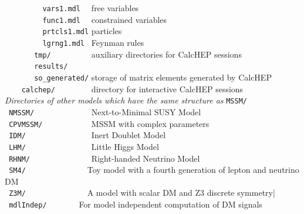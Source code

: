 \documentclass[12pt,a4paper]{article}
\begin{document}
\verb|         vars1.mdl  |  free  variables   \\
\verb|         func1.mdl  |  constrained variables   \\
\verb|         prtcls1.mdl|  particles  \\
\verb|         lgrng1.mdl |   Feynman rules\\
\verb|       tmp/         | auxiliary directories for CalcHEP sessions    \\
\verb|       results/  |                                                  \\
\verb|       so_generated/|   storage  of  matrix elements generated by CalcHEP \\
\verb|    calchep/        |   directory for interactive CalcHEP sessions    \\
{\it Directories of other models which have the same structure as} {\tt  MSSM/ }\\
\verb| NMSSM/             |         Next-to-Minimal SUSY Model\cite{Ellwanger:2006rn,Belanger:2005kh} \\
\verb| CPVMSSM/           |         MSSM with complex parameters\cite{Lee:2003nta,  Belanger:2006qa} \\
\verb| IDM/               |         Inert Doublet Model\cite{Barbieri:2006dq}  \\
\verb| LHM/               |         Little Higgs Model\cite{Belyaev:2006jh} \\
\verb| RHNM/              |         Right-handed Neutrino Model\cite{Belanger:2007dx}                  \\
\verb| SM4/              |         Toy model with a fourth generation of lepton and neutrino DM          \\
\verb| Z3M/              |         A model with scalar DM and Z3 discrete symmetry|\cite{Belanger:2012vp}             \\
\verb| mdlIndep/       |          For model independent computation of DM signals                                 \\
\end{document}
